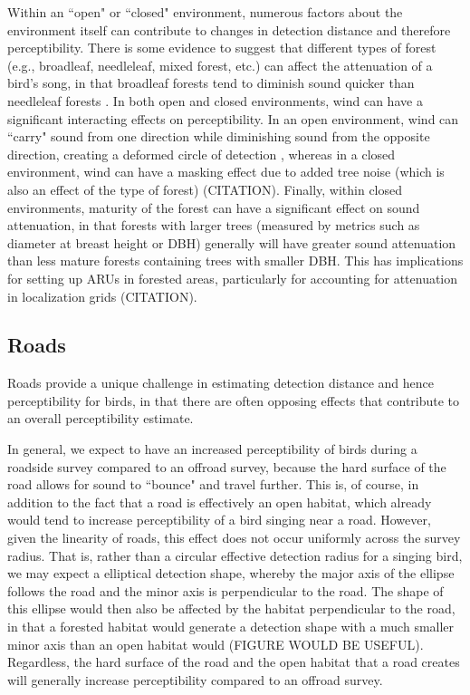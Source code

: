 \par Within an ``open" or ``closed" environment, numerous factors about the environment itself can contribute to changes in detection distance and therefore perceptibility.
There is some evidence to suggest that different types of forest (e.g., broadleaf, needleleaf, mixed forest, etc.) can affect the attenuation of a bird's song, in that broadleaf forests tend to diminish sound quicker than needleleaf forests \citep{schieck_biased_1997}.
In both open and closed environments, wind can have a significant interacting effects on perceptibility.
In an open environment, wind can ``carry" sound from one direction while diminishing sound from the opposite direction, creating a deformed circle of detection \citep{rigby_factors_2019}, whereas in a closed environment, wind can have a masking effect due to added tree noise (which is also an effect of the type of forest) (CITATION).
Finally, within closed environments, maturity of the forest can have a significant effect on sound attenuation, in that forests with larger trees (measured by metrics such as diameter at breast height or DBH) generally will have greater sound attenuation than less mature forests containing trees with smaller DBH.
This has implications for setting up ARUs in forested areas, particularly for accounting for attenuation in localization grids (CITATION).

\subsection{Roads}

\par Roads provide a unique challenge in estimating detection distance and hence perceptibility for birds, in that there are often opposing effects that contribute to an overall perceptibility estimate.

\par In general, we expect to have an increased perceptibility of birds during a roadside survey compared to an offroad survey, because the hard surface of the road allows for sound to ``bounce" and travel further.
This is, of course, in addition to the fact that a road is effectively an open habitat, which already would tend to increase perceptibility of a bird singing near a road.
However, given the linearity of roads, this effect does not occur uniformly across the survey radius.
That is, rather than a circular effective detection radius for a singing bird, we may expect a elliptical detection shape, whereby the major axis of the ellipse follows the road and the minor axis is perpendicular to the road.
The shape of this ellipse would then also be affected by the habitat perpendicular to the road, in that a forested habitat would generate a detection shape with a much smaller minor axis than an open habitat would (FIGURE WOULD BE USEFUL).
Regardless, the hard surface of the road and the open habitat that a road creates will generally increase perceptibility compared to an offroad survey.

